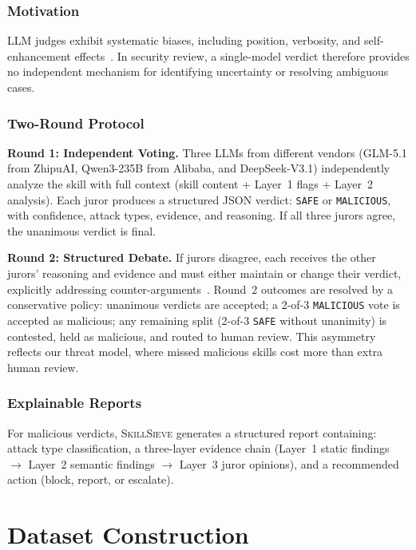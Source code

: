 \documentclass[sigconf,nonacm]{acmart}
\begin{document}
\subsubsection{Motivation}
LLM judges exhibit systematic biases, including position, verbosity, and self-enhancement effects~\cite{mtbench2023}. In security review, a single-model verdict therefore provides no independent mechanism for identifying uncertainty or resolving ambiguous cases.

\subsubsection{Two-Round Protocol}

\textbf{Round 1: Independent Voting.} Three LLMs from different vendors (GLM-5.1 from ZhipuAI, Qwen3-235B from Alibaba, and DeepSeek-V3.1) independently analyze the skill with full context (skill content + Layer~1 flags + Layer~2 analysis). Each juror produces a structured JSON verdict: \texttt{SAFE} or \texttt{MALICIOUS}, with confidence, attack types, evidence, and reasoning. If all three jurors agree, the unanimous verdict is final.

\textbf{Round 2: Structured Debate.} If jurors disagree, each receives the other jurors' reasoning and evidence and must either maintain or change their verdict, explicitly addressing counter-arguments~\cite{multiagentdebate2023}. Round~2 outcomes are resolved by a conservative policy: unanimous verdicts are accepted; a 2-of-3 \texttt{MALICIOUS} vote is accepted as malicious; any remaining split (2-of-3 \texttt{SAFE} without unanimity) is contested, held as malicious, and routed to human review. This asymmetry reflects our threat model, where missed malicious skills cost more than extra human review.

\subsubsection{Explainable Reports}
For malicious verdicts, \textsc{SkillSieve} generates a structured report containing: attack type classification, a three-layer evidence chain (Layer~1 static findings $\rightarrow$ Layer~2 semantic findings $\rightarrow$ Layer~3 juror opinions), and a recommended action (block, report, or escalate).

\section{Dataset Construction}
\label{sec:dataset}
\end{document}
